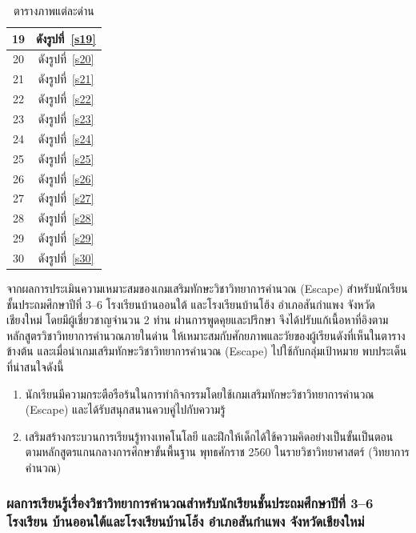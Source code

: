 \begin{table}[H]
\begin{center}
\begin{tabular}{|c | c|}
            19 &  ดังรูปที่~\ref{s19} \\ 
            \hline
            20 &  ดังรูปที่~\ref{s20} \\ 
            \hline
            21 &  ดังรูปที่~\ref{s21} \\ 
            \hline
            22 &  ดังรูปที่~\ref{s22} \\ 
            \hline
            23 &  ดังรูปที่~\ref{s23} \\ 
            \hline
            24 &  ดังรูปที่~\ref{s24} \\ 
            \hline
            25 &  ดังรูปที่~\ref{s25} \\ 
            \hline
            26 &  ดังรูปที่~\ref{s26} \\ 
            \hline
            27 &  ดังรูปที่~\ref{s27} \\ 
            \hline
            28 &  ดังรูปที่~\ref{s28} \\ 
            \hline
            29 &  ดังรูปที่~\ref{s29} \\ 
            \hline
            30 &  ดังรูปที่~\ref{s30} \\ 
            \hline
        \end{tabular}
    \end{center}
    \caption[ตารางภาพแต่ละด่าน]{ตารางภาพแต่ละด่าน}
    \label{mappictable}
\end{table}
จากผลการประเมินความเหมาะสมของเกมเสริมทักษะวิชาวิทยาการคำนวณ (Escape) สำหรับนักเรียนชั้นประถมศึกษาปีที่ 
3--6 โรงเรียนบ้านออนใต้ และโรงเรียนบ้านโฮ้ง อำเภอสันกำแพง จังหวัดเชียงใหม่ 
โดยมีผู้เชี่ยวชาญจำนวน 2 ท่าน ผ่านการพูดคุยและปรึกษา จึงได้ปรับแก้เนื้อหาที่อิงตามหลักสูตรวิชาวิทยาการคำนวณภายในด่าน 
ให้เหมาะสมกับศักยภาพและวัยของผู้เรียนดังที่เห็นในตารางข้างต้น และเมื่อนำเกมเสริมทักษะวิชาวิทยาการคำนวณ (Escape) 
ไปใช้กับกลุ่มเป้าหมาย พบประเด็นที่น่าสนใจดังนี้

\begin{enumerate}
    \item นักเรียนมีความกระตือรือร้นในการทำกิจกรรมโดยใช้เกมเสริมทักษะวิชาวิทยาการคำนวณ (Escape) และได้รับสนุกสนานควบคู่ไปกับความรู้ 
    \item เสริมสร้างกระบวนการเรียนรู้ทางเทคโนโลยี และฝึกให้เด็กได้ใช้ความคิดอย่างเป็นขั้นเป็นตอน ตามหลักสูตรแกนกลางการศึกษาขั้นพื้นฐาน พุทธศักราช 2560 ในรายวิชาวิทยาศาสตร์ (วิทยาการคำนวณ)
\end{enumerate}

\subsubsection{ผลการเรียนรู้เรื่องวิชาวิทยาการคำนวณสำหรับนักเรียนชั้นประถมศึกษาปีที่ 3--6 โรงเรียน บ้านออนใต้และโรงเรียนบ้านโฮ้ง อำเภอสันกำแพง จังหวัดเชียงใหม่}

